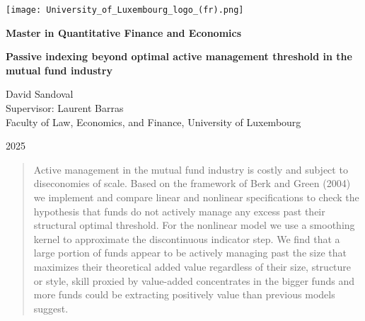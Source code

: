 \documentclass[12pt]{article}
\begin{document}
\begin{titlepage}
    \centering
    \texttt{[image: University\_of\_Luxembourg\_logo\_(fr).png]}
    
    \vspace{2cm}

    {\Large\textbf{Master in Quantitative Finance and Economics}}
    
    \vspace{2cm}
    
    {\Huge\textbf{Passive indexing beyond optimal active management threshold in the mutual fund industry}}
    
    \vspace{2cm}

    {\Large David Sandoval\\
    \vspace{0.5cm}
    \normalsize Supervisor: Laurent Barras\\
    \normalsize Faculty of Law, Economics, and Finance, University of Luxembourg}
    
    \vfill
    
    \normalsize 2025

\end{titlepage}

\newpage %

\tableofcontents

\newpage
\begin{abstract}
Active management in the mutual fund industry is costly and subject to diseconomies of scale. Based on the framework of Berk and Green (2004) we implement and compare linear and nonlinear specifications to check the hypothesis that funds do not actively manage any excess past their structural optimal threshold. For the nonlinear model we use a smoothing kernel to approximate the discontinuous indicator step. We find that a large portion of funds appear to be actively managing past the size that maximizes their theoretical added value regardless of their size, structure or style, skill proxied by value-added concentrates in the bigger funds and more funds could be extracting positively value than previous models suggest. 
\end{abstract}
\end{document}
